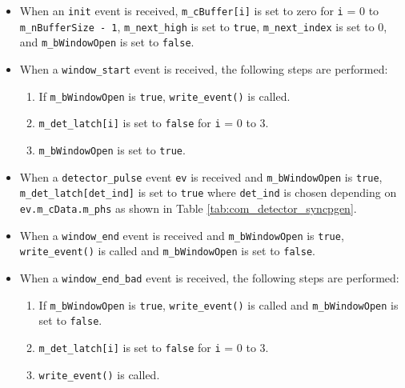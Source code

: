\begin{itemize}

\item When an \texttt{init} event is received, \texttt{m\_cBuffer[i]} is set to zero for \texttt{i} = 0 to \texttt{m\_nBufferSize - 1}, \texttt{m\_next\_high} is set to \texttt{true}, \texttt{m\_next\_index} is set to 0, and \texttt{m\_bWindowOpen} is set to \texttt{false}.

\item When a \texttt{window\_start} event is received, the following steps are performed:

\begin{enumerate}

\item If \texttt{m\_bWindowOpen} is \texttt{true}, \texttt{write\_event()} is called.

\item \texttt{m\_det\_latch[i]} is set to \texttt{false} for \texttt{i} = 0 to 3.

\item \texttt{m\_bWindowOpen} is set to \texttt{true}.

\end{enumerate}

\item When a \texttt{detector\_pulse} event \texttt{ev} is received and \texttt{m\_bWindowOpen} is \texttt{true}, \texttt{m\_det\_latch[det\_ind]} is set to \texttt{true} where \texttt{det\_ind} is chosen depending on \texttt{ev.m\_cData.m\_phs} as shown in Table \ref{tab:com_detector_syncpgen}.

\item When a \texttt{window\_end} event is received and \texttt{m\_bWindowOpen} is \texttt{true}, \texttt{write\_event()} is called and \texttt{m\_bWindowOpen} is set to \texttt{false}.

\item When a \texttt{window\_end\_bad} event is received, the following steps are performed:

\begin{enumerate}

\item If \texttt{m\_bWindowOpen} is \texttt{true}, \texttt{write\_event()} is called and \texttt{m\_bWindowOpen} is set to \texttt{false}.

\item \texttt{m\_det\_latch[i]} is set to \texttt{false} for \texttt{i} = 0 to 3.

\item \texttt{write\_event()} is called.


\end{enumerate}
\end{itemize}
